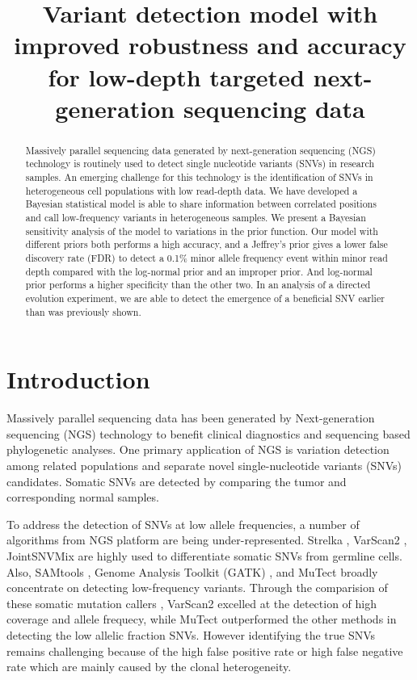 \documentclass[11pt,reqno]{amsart}
\title[RVD3]{Variant detection model with improved robustness and accuracy for low-depth targeted next-generation sequencing data}
\author{}
\begin{document}
\begin{abstract}

Massively parallel sequencing data generated by next-generation sequencing (NGS) technology is routinely used to detect single nucleotide variants (SNVs) in research samples.
An emerging challenge for this technology is the identification of SNVs in heterogeneous cell populations with low read-depth data.
We have developed a Bayesian statistical model is able to share information between correlated positions and call low-frequency variants in heterogeneous samples.
We present a Bayesian sensitivity analysis of the model to variations in the prior function.
Our model with different priors both performs a high accuracy, and a Jeffrey's prior gives a lower false discovery rate (FDR) to detect a 0.1\% minor allele frequency event within minor read depth compared with the log-normal prior and an improper prior. 
And log-normal prior performs a higher specificity than the other two. 
In an analysis of a directed evolution experiment, we are able to detect the emergence of a beneficial SNV earlier than was previously shown.

\end{abstract}

\maketitle

\section{Introduction}

Massively parallel sequencing data has been generated by Next-generation sequencing (NGS) technology to benefit clinical diagnostics and sequencing based phylogenetic analyses.
One primary application of NGS is variation detection among related populations and separate novel single-nucleotide variants (SNVs) candidates.
Somatic SNVs are detected by comparing the tumor and corresponding normal samples.

To address the detection of SNVs at low allele frequencies, a number of algorithms from NGS platform are being under-represented.
Strelka \citep{Saunders:2012fh}, VarScan2 \citep{Koboldt:2012cga}, JointSNVMix \citep{roth2012jointsnvmix} are highly used to differentiate somatic SNVs from germline cells.
Also, SAMtools \citep{li2009sequence}, Genome Analysis Toolkit (GATK) \citep{McKenna:2010bva}, and MuTect \citep{Cibulskis:2013ta} broadly concentrate on detecting low-frequency variants.
Through the comparision of these somatic mutation callers \citep{wang2013detecting}, VarScan2 excelled at the detection of high coverage and allele frequecy, while MuTect outperformed the other methods in detecting the low allelic fraction SNVs.
However identifying the true SNVs remains challenging because of the high false positive rate or high false negative rate which are mainly caused by the clonal heterogeneity.
\end{document}
